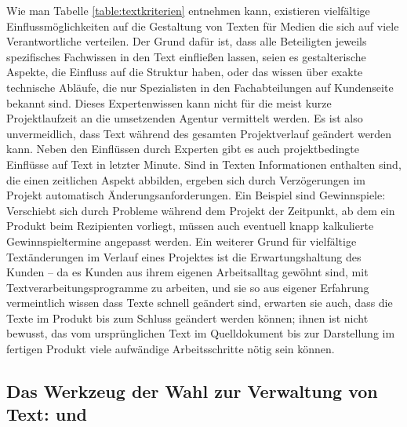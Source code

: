 Wie man Tabelle \ref{table:textkriterien} entnehmen kann, existieren vielfältige Einflussmöglichkeiten auf die Gestaltung von Texten für Medien die sich auf viele Verantwortliche verteilen. Der Grund dafür ist, dass alle Beteiligten jeweils spezifisches Fachwissen in den Text einfließen lassen, seien es gestalterische Aspekte, die Einfluss auf die Struktur haben, oder das wissen über exakte technische Abläufe, die nur Spezialisten in den Fachabteilungen auf Kundenseite bekannt sind. Dieses Expertenwissen kann nicht für die meist kurze Projektlaufzeit an die umsetzenden Agentur vermittelt werden. Es ist also unvermeidlich, dass Text während des gesamten Projektverlauf geändert werden kann. Neben den Einflüssen durch Experten gibt es auch projektbedingte Einflüsse auf Text in letzter Minute. Sind in Texten Informationen enthalten sind, die einen zeitlichen Aspekt abbilden, ergeben sich durch Verzögerungen im Projekt automatisch Änderungsanforderungen. Ein Beispiel sind Gewinnspiele: Verschiebt sich durch Probleme während dem Projekt der Zeitpunkt, ab dem ein Produkt beim Rezipienten vorliegt, müssen auch eventuell knapp kalkulierte Gewinnspieltermine angepasst werden. Ein weiterer Grund für vielfältige Textänderungen im Verlauf eines Projektes ist die Erwartungshaltung des Kunden -- da es Kunden aus ihrem eigenen Arbeitsalltag gewöhnt sind, mit Textverarbeitungsprogramme zu arbeiten, und sie so aus eigener Erfahrung vermeintlich wissen dass Texte schnell geändert sind, erwarten sie auch, dass die Texte im Produkt bis zum Schluss geändert werden können; ihnen ist nicht bewusst, das vom ursprünglichen Text im Quelldokument bis zur Darstellung im fertigen Produkt viele aufwändige Arbeitsschritte nötig sein können.

\subsection{Das Werkzeug der Wahl zur Verwaltung von Text:  und }

